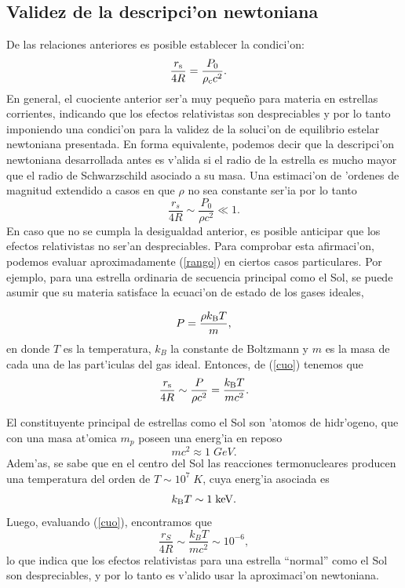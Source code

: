 \subsection{Validez de la descripci'on newtoniana}

De las relaciones anteriores es posible establecer la condici'on:
\begin{align}
\frac{r_{\rm s}}{4R}&=\frac{P_0}{\rho_{\rm c} c^2}. \label{rango}
\end{align}
En general, el cuociente anterior ser'a muy peque\~no para materia en estrellas corrientes, indicando que los efectos relativistas son despreciables y por lo tanto imponiendo una condici'on para la validez de la soluci'on de equilibrio estelar newtoniana presentada. En forma equivalente, podemos decir que la descripci'on newtoniana desarrollada antes es v'alida si el radio de la estrella es mucho mayor que el radio de Schwarzschild asociado a su masa. Una estimaci'on de 'ordenes de magnitud extendido a casos en que $\rho$ no sea constante ser'ia por lo tanto
\begin{equation}\label{cuo}
\frac{r_s}{4R}\sim\frac{P_0}{\rho c^2}\ll 1.
\end{equation}
En caso que no se cumpla la desigualdad anterior, es posible anticipar que los efectos relativistas no ser'an despreciables. Para comprobar esta afirmaci'on, podemos evaluar aproximadamente (\ref{rango})  en ciertos casos particulares. Por ejemplo, para una estrella ordinaria de secuencia principal como el Sol, se puede asumir que su materia satisface la ecuaci'on de estado de los gases ideales,

\begin{equation}
P=\frac{\rho k_{\rm B} T}{m},
\end{equation}
en donde $T$ es la temperatura, $k_B$ la constante de Boltzmann y $m$ es la masa de cada una de las part'iculas del gas ideal. Entonces, de (\ref{cuo}) tenemos que
\begin{equation}
\frac{r_{\rm s}}{4R}\sim\frac{P}{\rho c^2}=\frac{k_{\rm B}T}{mc^2}.
\end{equation}

El constituyente principal de estrellas como el Sol son 'atomos de hidr'ogeno, que con una masa at'omica $m_p$ poseen una energ'ia en reposo
\begin{equation}
mc^2\approx1\;GeV.
\end{equation}
Adem'as, se sabe que en el centro del Sol las reacciones termonucleares producen una temperatura del orden de $T\sim 10^7\; K$, cuya energ'ia asociada es
\begin{equation}\label{17}
k_{\rm B}T\sim 1\; {\rm keV}.
\end{equation}
Luego, evaluando (\ref{cuo}), encontramos que
\begin{equation}\label{18}
\frac{r_S}{4R}\sim\frac{k_{B}T}{mc^2}\sim10^{-6},
\end{equation}
lo que indica que los efectos relativistas para una estrella ``normal'' como el Sol son despreciables, y por lo tanto es v'alido usar la aproximaci'on newtoniana.


